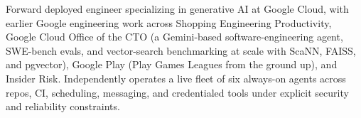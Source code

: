 


Forward deployed engineer specializing in generative AI at Google Cloud, with earlier Google engineering work across Shopping Engineering Productivity, Google Cloud Office of the CTO (a Gemini-based software-engineering agent, SWE-bench evals, and vector-search benchmarking at scale with ScaNN, FAISS, and pgvector), Google Play (Play Games Leagues from the ground up), and Insider Risk. Independently operates a live fleet of six always-on agents across repos, CI, scheduling, messaging, and credentialed tools under explicit security and reliability constraints.







